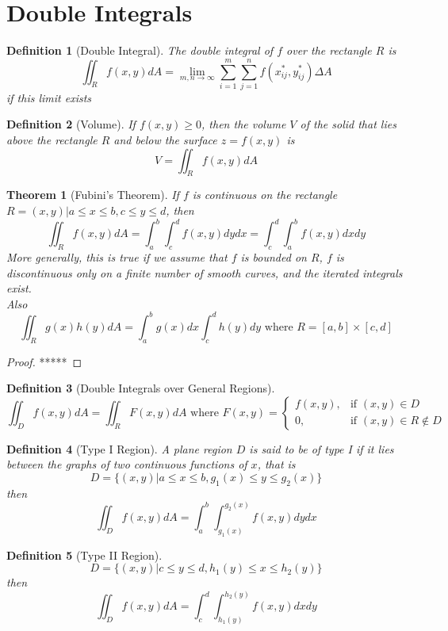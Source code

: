 \documentclass[10pt]{report}
\newtheorem{thm2}{Theorem}[section]
\newtheorem{def2}{Definition}[section]
\begin{document}
\section{Double Integrals}
\begin{def2}[Double Integral]
The double integral of $f$ over the rectangle $R$ is
$$\iint_R f(x,y)dA=\lim_{m,n\to \infty} \sum_{i=1}^m\sum_{j=1}^n f(x_{ij}^*, y_{ij}^*) \Delta A$$
if this limit exists
\end{def2}
\begin{def2}[Volume]
If $f(x,y)\geq 0$, then the volume $V$ of the solid that lies above the rectangle $R$ and below the surface $z=f(x,y)$ is
$$V=\iint_Rf(x,y)dA$$
\end{def2}
\begin{thm2}[Fubini's Theorem]
If $f$ is continuous on the rectangle $R={(x,y)|a\leq x\leq b, c\leq y\leq d}$, then
$$\iint_Rf(x,y)dA = \int_a^b\int_c^d f(x,y)dydx = \int_c^d\int_a^b f(x,y)dxdy$$
More generally, this is true if we assume that $f$ is bounded on $R$, $f$ is discontinuous only on a finite number of smooth curves, and the iterated integrals exist.\\
Also
$$\iint_R g(x)h(y)dA = \int_a^bg(x)dx \int_c^dh(y)dy \text{  where  } R=[a,b] \times [c,d]$$
\end{thm2}
\begin{proof}
*****
\end{proof}
\begin{def2}[Double Integrals over General Regions]
$$\iint_Df(x,y)dA = \iint_R F(x,y)dA \text{  where  } F(x,y)=\begin{cases}
f(x,y), & \text{if  }(x,y)\in D\\
0, & \text{if  }(x,y)\in R \notin D
\end{cases}$$
\end{def2}
\begin{def2}[Type I Region]
A plane region $D$ is said to be of type I if it lies between the graphs of two continuous functions of $x$, that is
$$D = \{ (x,y)| a\leq x \leq b, g_1(x)\leq y \leq g_2(x)\}$$
then
$$\iint_Df(x,y)dA=\int_a^b \int_{g_1(x)}^{g_2(x)}f(x,y)dydx$$
\end{def2}
\begin{def2}[Type II Region]
$$D = \{ (x,y)| c\leq y \leq d, h_1(y)\leq x \leq h_2(y)\}$$
then
$$\iint_Df(x,y)dA=\int_c^d \int_{h_1(y)}^{h_2(y)}f(x,y)dxdy$$
\end{def2}
\end{document}
